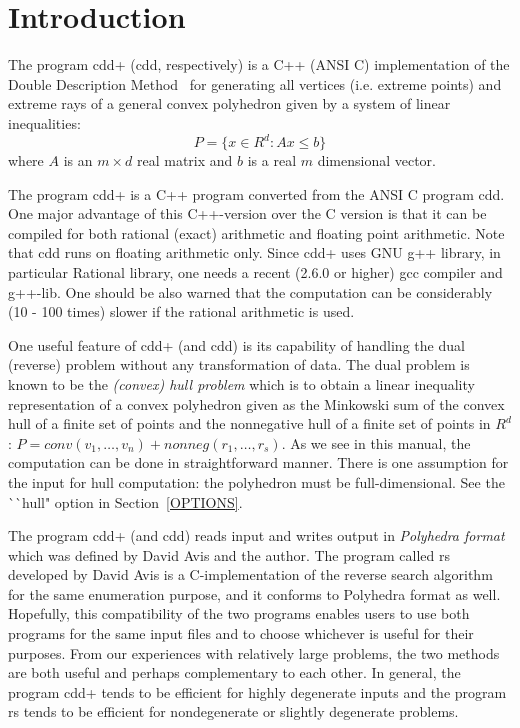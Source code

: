 \section{Introduction} \label{INTRODUCTION}

The program  cdd+  (cdd, respectively)   is 
a C++  (ANSI C) implementation of 
the Double Description Method~\cite{MRTT}
for generating all vertices (i.e. extreme points)
and extreme rays of a general 
convex polyhedron given by a system of linear inequalities:
\[
   P = \{ x  \in R^d:  A  x  \le  b \}
\]
where $A$ is an $m \times d$ real matrix and $b$ is a real
$m$ dimensional vector.

The program cdd+ is a C++ program converted from the ANSI C
program cdd.  One major advantage of this C++-version over the C version is
that it can be compiled for both rational (exact) arithmetic and 
floating point arithmetic.  Note that cdd runs on floating
arithmetic only.  Since cdd+ uses GNU g++ library, in particular 
Rational library, one needs a recent (2.6.0 or higher) gcc compiler
and g++-lib.  One should be also warned that the computation
can be considerably  (10 - 100 times) slower if the rational
arithmetic is used.

One useful feature of  cdd+ (and cdd) is its capability
of handling the dual (reverse)  problem without any transformation
of data.  The dual problem is known to be the 
{\em (convex) hull problem\/} which
is to obtain a linear inequality representation
of a convex polyhedron given as the Minkowski sum of 
the convex hull of a finite set of points and the nonnegative
hull of a finite set of points in $R^d$: 
$P = conv(v_1,\ldots,v_n) +  nonneg(r_1,\ldots,r_s)$.
As we see in this manual, the computation can be done
in straightforward manner.  There is one assumption for the input
for hull computation: the polyhedron must be full-dimensional.
See the ^^ ^^ hull" option in Section~\ref{OPTIONS}.

The program cdd+ (and cdd) reads input and writes output in 
{\em Polyhedra format\/} which was defined by David Avis and
the author.  The program called rs developed by David Avis is
a C-implementation of the reverse search algorithm~\cite{AF} 
for the same enumeration purpose, and it conforms to Polyhedra format as well.
Hopefully, this compatibility of the two programs
enables users to use both programs for the same input files
and to choose whichever is useful for their purposes.
From our experiences with relatively large problems,
the two methods are both useful and perhaps complementary
to each other.  In general, the program cdd+ tends to be
efficient for highly degenerate inputs and the program rs
tends to be efficient for nondegenerate or slightly
degenerate problems.

